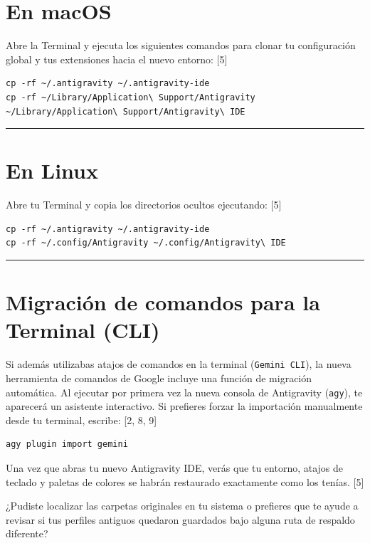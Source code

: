 \documentclass[12pt, a4paper]{article}
\begin{document}
\section*{En macOS}

Abre la Terminal y ejecuta los siguientes comandos para clonar tu configuración global y tus extensiones hacia el nuevo entorno: [5]

\begin{verbatim}
cp -rf ~/.antigravity ~/.antigravity-ide
cp -rf ~/Library/Application\ Support/Antigravity ~/Library/Application\ Support/Antigravity\ IDE
\end{verbatim}

\noindent\rule{\textwidth}{0.4pt}

\section*{En Linux}

Abre tu Terminal y copia los directorios ocultos ejecutando: [5]

\begin{verbatim}
cp -rf ~/.antigravity ~/.antigravity-ide
cp -rf ~/.config/Antigravity ~/.config/Antigravity\ IDE
\end{verbatim}

\noindent\rule{\textwidth}{0.4pt}

\section*{Migración de comandos para la Terminal (CLI)}

Si además utilizabas atajos de comandos en la terminal (\texttt{Gemini CLI}), la nueva herramienta de comandos de Google incluye una función de migración automática. Al ejecutar por primera vez la nueva consola de Antigravity (\texttt{agy}), te aparecerá un asistente interactivo. Si prefieres forzar la importación manualmente desde tu terminal, escribe: [2, 8, 9]

\begin{verbatim}
agy plugin import gemini
\end{verbatim}

Una vez que abras tu nuevo Antigravity IDE, verás que tu entorno, atajos de teclado y paletas de colores se habrán restaurado exactamente como los tenías. [5]

¿Pudiste localizar las carpetas originales en tu sistema o prefieres que te ayude a revisar si tus perfiles antiguos quedaron guardados bajo alguna ruta de respaldo diferente?
\end{document}

